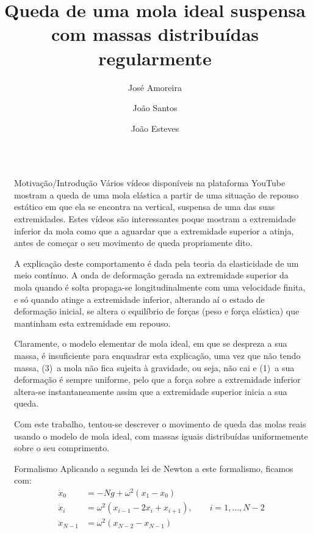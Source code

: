 \documentclass[final]{beamer}
\title{Queda de uma mola ideal suspensa com massas distribuídas regularmente}
\author{José Amoreira \inst{1,2,3} \and João Santos \inst{2} \and João Esteves \inst{2}}
\institute[]{\inst{1} Laboratório de Instrumentação e Física Experimental de Partículas \and  \inst{2}Universidade da Beira Interior  \samelineand \inst{3} Centro de Matemática e Aplicações}
\newlength{\sepwidth}
\newlength{\colwidth}
\newcommand{\separatorcolumn}{\begin{column}{\sepwidth}\end{column}}
\begin{document}
\begin{frame}[t]
\begin{columns}[t]
\separatorcolumn

\begin{column}{\colwidth}

  \begin{exampleblock}{Motivação/Introdução}
Vários vídeos disponíveis na plataforma YouTube mostram a queda de uma mola
elástica a partir de uma situação de repouso estático em que ela se encontra na
vertical, suspensa de uma das suas extremidades. Estes vídeos são interessantes
poque mostram a extremidade inferior da mola como que a aguardar que a
extremidade superior a atinja, antes de começar o seu movimento de queda
propriamente dito. 

A explicação deste comportamento é dada pela teoria da elasticidade de um meio
contínuo. A onda de deformação gerada na extremidade superior da mola quando é
solta propaga-se longitudinalmente com uma velocidade finita, e só quando atinge
a extremidade inferior, alterando aí o estado de deformação inicial, se altera o
equilíbrio de forças (peso e força elástica) que mantinham esta extremidade em
repouso.

Claramente, o modelo elementar de mola ideal, em que se despreza a sua massa, é
insuficiente para enquadrar esta explicação, uma vez que não tendo massa, (3)~a
mola não fica sujeita à gravidade, ou seja, não cai e (1)~a sua deformação é
sempre uniforme, pelo que a força sobre a extremidade inferior altera-se
instantaneamente assim que a extremidade superior inicia a sua queda. 

Com este trabalho, tentou-se descrever o movimento de queda das molas reais
usando o modelo de mola ideal, com massas iguais distribuídas uniformemente
sobre o seu comprimento.
  \end{exampleblock}
  

\begin{block}{Formalismo}
    Aplicando a segunda lei de Newton a este formalismo, ficamos com:
    \begin{align*}
        \ddot x_0 &=-Ng+\omega^2(x_1-x_0)\\[1cm] 
        \ddot x_i &= \omega^2(x_{i-1}-2x_i+x_{i+1}),\qquad i=1, \ldots, N-2\\[1cm]
         \ddot x_{N-1} &=\omega^2(x_{N-2}-x_{N-1})
    \end{align*}    
\end{block}


\end{column}
\end{columns}
\end{frame}
\end{document}
